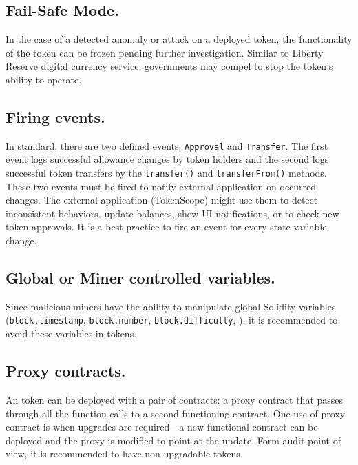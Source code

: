 \subsection{Fail-Safe Mode.}\label{subsec:failsf}

In the case of a detected anomaly or attack on a deployed \erc token, the functionality of the token can be frozen pending further investigation. { \blue Similar to Liberty Reserve digital currency service\cite{LibertyReserve}, governments may compel to stop the token's ability to operate.} 


\subsection{Firing events.}\label{subsec:evnts}

In \erc standard, there are two defined events: \texttt{Approval} and \texttt{Transfer}. The first event logs successful allowance changes by token holders and the second logs successful token transfers by the \texttt{transfer()} and \texttt{transferFrom()} methods. These two events must be fired to notify external application on occurred changes. The external application (\eg TokenScope\cite{TokenScope}) might use them to detect inconsistent behaviors, update balances, show UI notifications, or to check new token approvals. It is a best practice to fire an event for every state variable change.

\subsection{Global or Miner controlled variables.}\label{subsec:miner}

Since malicious miners have the ability to manipulate global Solidity variables (\eg \texttt{block.timestamp}, \texttt{block.number}, \texttt{block.difficulty}, \etc), it is recommended to avoid these variables in \erc tokens.

\subsection{Proxy contracts.}\label{subsec:prxy}

An \erc token can be deployed with a pair of contracts: a proxy contract that passes through all the function calls to a second functioning \erc contract\cite{ProxyContract,ProxyPatterns}. One use of proxy contract is when upgrades are required---a new functional contract can be deployed and the proxy is modified to point at the update. Form audit point of view, it is recommended to have non-upgradable \erc tokens. 

